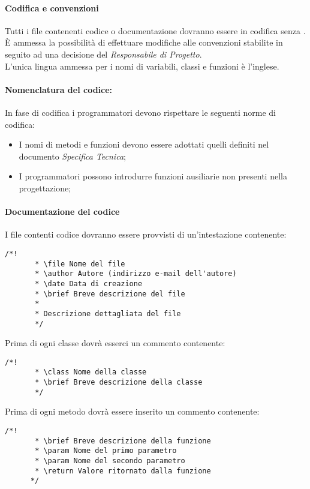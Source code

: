    \paragraph{Codifica e convenzioni}
   Tutti i file contenenti codice o documentazione dovranno essere in codifica  senza .\\
   È ammessa la possibilità di effettuare modifiche alle convenzioni stabilite in seguito ad una decisione del \emph{Responsabile di Progetto}.\\
   L’unica lingua ammessa per i nomi di variabili, classi e funzioni è l’inglese.

\paragraph{Nomenclatura del codice:}
In fase di codifica i programmatori devono rispettare le seguenti norme di codifica:
\begin{itemize}
\item I nomi di metodi e funzioni devono essere adottati quelli definiti nel documento \emph{Specifica Tecnica};
\item I programmatori possono introdurre funzioni ausiliarie non presenti nella progettazione;
\end{itemize}   
     
   
   \paragraph{Documentazione del codice}
     I file contenti codice dovranno essere provvisti di un'intestazione contenente:
     \begin{lstlisting}[frame=single]
       /*!
       * \file Nome del file
       * \author Autore (indirizzo e-mail dell'autore)
       * \date Data di creazione
       * \brief Breve descrizione del file
       *
       * Descrizione dettagliata del file
       */
     \end{lstlisting}
     Prima di ogni classe dovrà esserci un commento contenente:
     \begin{lstlisting}[frame=single]
       /*!
       * \class Nome della classe
       * \brief Breve descrizione della classe
       */
     \end{lstlisting}
     Prima di ogni metodo dovrà essere inserito un commento contenente:
     \begin{lstlisting}[frame=single]
       /*!
       * \brief Breve descrizione della funzione
       * \param Nome del primo parametro
       * \param Nome del secondo parametro
       * \return Valore ritornato dalla funzione
      */
  \end{lstlisting}
      
